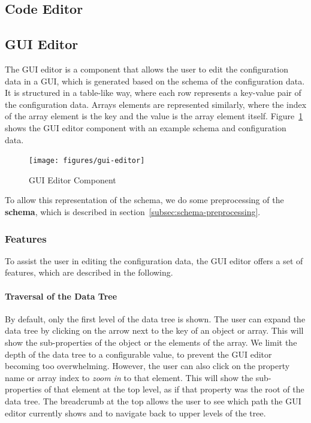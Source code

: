 \subsection{Code Editor}\label{subsec:code-editor}


\subsection{GUI Editor}\label{subsec:gui-editor}

The GUI editor is a component that allows the user to edit the configuration data in a GUI, which is generated based on the schema of the configuration data.
It is structured in a table-like way, where each row represents a key-value pair of the configuration data.
Arrays elements are represented similarly, where the index of the array element is the key and the value is the array element itself.
Figure~\ref{fig:gui-editor} shows the GUI editor component with an example schema and configuration data.

\begin{figure}[!t]
    \centering
    \texttt{[image: figures/gui-editor]} %
    \caption{GUI Editor Component}
    \label{fig:gui-editor}
\end{figure}

To allow this representation of the schema, we do some preprocessing of the \textbf{schema}, which is described in section~\ref{subsec:schema-preprocessing}.

\subsubsection{Features}\label{subsubsec:gui-editor-features}

To assist the user in editing the configuration data, the GUI editor offers a set of features, which are described in the following.

\paragraph{Traversal of the Data Tree}
By default, only the first level of the data tree is shown.
The user can expand the data tree by clicking on the arrow next to the key of an object or array.
This will show the sub-properties of the object or the elements of the array.
We limit the depth of the data tree to a configurable value, to prevent the GUI editor becoming too overwhelming.
However, the user can also click on the property name or array index to \textit{zoom in} to that element.
This will show the sub-properties of that element at the top level, as if that property was the root of the data tree.
The breadcrumb at the top allows the user to see which path the GUI editor currently shows and to navigate back to upper levels of the tree.

